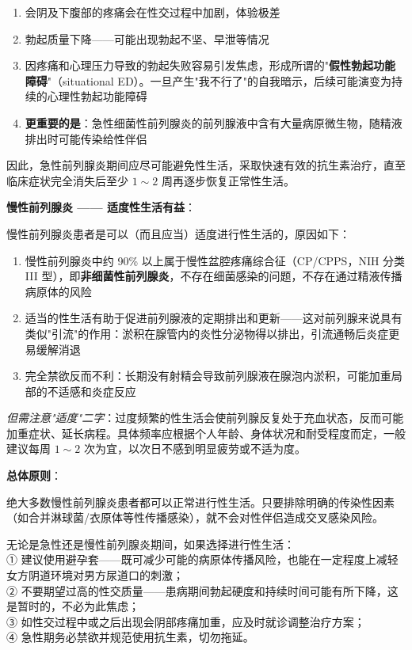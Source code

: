 \begin{enumerate}
	\item 会阴及下腹部的疼痛会在性交过程中加剧，体验极差
	\item 勃起质量下降——可能出现勃起不坚、早泄等情况
	\item 因疼痛和心理压力导致的勃起失败容易引发焦虑，形成所谓的"\textbf{假性勃起功能障碍}"（situational ED）。一旦产生"我不行了"的自我暗示，后续可能演变为持续的心理性勃起功能障碍
	\item \textbf{更重要的是}：急性细菌性前列腺炎的前列腺液中含有大量病原微生物，随精液排出时可能传染给性伴侣
\end{enumerate}

因此，急性前列腺炎期间应尽可能避免性生活，采取快速有效的抗生素治疗，直至临床症状完全消失后至少 $1\sim2$ 周再逐步恢复正常性生活。

\vspace{0.5em}
\noindent\textbf{慢性前列腺炎 —— 适度性生活有益}：

慢性前列腺炎患者是可以（而且应当）适度进行性生活的，原因如下：

\begin{enumerate}
	\item 慢性前列腺炎中约 90\% 以上属于慢性盆腔疼痛综合征（CP/CPPS，NIH 分类 III 型），即\textbf{非细菌性前列腺炎}，不存在细菌感染的问题，不存在通过精液传播病原体的风险

	\item 适当的性生活有助于促进前列腺液的定期排出和更新——这对前列腺来说具有类似"引流"的作用：淤积在腺管内的炎性分泌物得以排出，引流通畅后炎症更易缓解消退

	\item 完全禁欲反而不利：长期没有射精会导致前列腺液在腺泡内淤积，可能加重局部的不适感和炎症反应
\end{enumerate}

\noindent\textit{但需注意"适度"二字}：过度频繁的性生活会使前列腺反复处于充血状态，反而可能加重症状、延长病程。具体频率应根据个人年龄、身体状况和耐受程度而定，一般建议每周 $1\sim2$ 次为宜，以次日不感到明显疲劳或不适为度。

\vspace{0.5em}
\noindent\textbf{总体原则}：

绝大多数慢性前列腺炎患者都可以正常进行性生活。只要排除明确的传染性因素（如合并淋球菌/衣原体等性传播感染），就不会对性伴侣造成交叉感染风险。

\begin{tcolorbox}[colback=pink!5!white,colframe=red!50!black,title=贴心小叮咛]
无论是急性还是慢性前列腺炎期间，如果选择进行性生活：\\
① 建议使用避孕套——既可减少可能的病原体传播风险，也能在一定程度上减轻女方阴道环境对男方尿道口的刺激；\\
② 不要期望过高的性交质量——患病期间勃起硬度和持续时间可能有所下降，这是暂时的，不必为此焦虑；\\
③ 如性交过程中或之后出现会阴部疼痛加重，应及时就诊调整治疗方案；\\
④ 急性期务必禁欲并规范使用抗生素，切勿拖延。
\end{tcolorbox}


